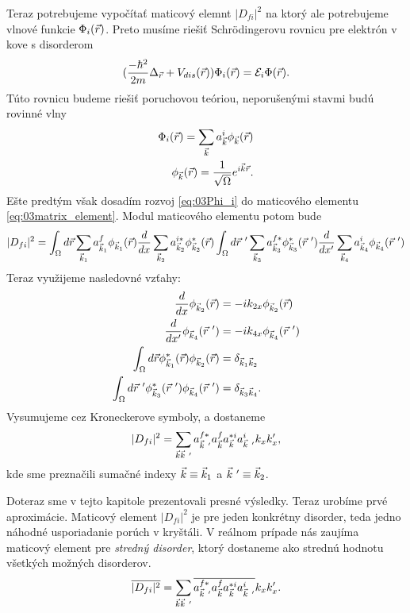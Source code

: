 Teraz potrebujeme vypočítať maticový elemnt $|D_{fi}|^2$ na ktorý ale potrebujeme vlnové funkcie $\Phi_i(\vec{r})$. Preto musíme riešiť Schr\"odingerovu rovnicu pre elektrón v kove s disorderom
\begin{align}
\label{eq:03SchrDis}
(\frac{-\hbar^2}{2m}\Delta_{\vec{r}} + V_{dis}(\vec{r}))\Phi_i(\vec{r})=\mathcal{E}_i\Phi(\vec{r})  \text{.}
\end{align}
Túto rovnicu budeme riešiť poruchovou teóriou, neporušenými stavmi budú rovinné vlny
\begin{align}
\label{eq:03Phi_i}
\Phi_i(\vec{r})=\sum_{\vec{k}}a^i_{\vec{k}}\phi_{\vec{k}}(\vec{r})\\
\label{eq:03rov}
\phi_{\vec{k}}(\vec{r})=\frac{1}{\sqrt \Omega}e^{i\vec{k}\vec{r}}\text{.}
\end{align}
Ešte predtým však dosadím rozvoj \eqref{eq:03Phi_i} do maticového elementu \eqref{eq:03matrix_element}. Modul maticového elementu potom bude
\begin{align}
|D_{fi}|^2=\int_\Omega d\vr \sum_{\vk_1}a_{\vk_1}^f\phi_{\vk_1}(\vr)\frac{d}{dx}\sum_{\vk_2}a_{\vk_2}^{i*}\phi_{\vk_2}^*(\vr)\int_\Omega d\vr\ ' \sum_{\vk_3}a_{\vk_3}^{f*}\phi_{\vk_3}^*(\vr\ ')\frac{d}{dx'}\sum_{\vk_4}a_{\vk_4}^i \phi_{\vk_4}(\vr\ ')
\end{align}
Teraz využijeme nasledovné vzťahy:
\begin{align}
\frac{d}{dx}\phi_{\vk_2}(\vr)&=-ik_{2x}\phi_{\vk_2}(\vr)\\
\frac{d}{dx'}\phi_{\vk_4}(\vr\ ')&=-ik_{4x}\phi_{\vk_4}(\vr\ ')\\
\int_\Omega d\vr \phi_{\vk_1}^*(\vr)\phi_{\vk_2}(\vr)&=\delta_{\vk_1\vk_2}\\
\int_\Omega d\vr\ '\phi_{\vk_3}^*(\vr\ ')\phi_{\vk_4}(\vr\ ')&=\delta_{\vk_3\vk_4} \text{.}
\end{align}
Vysumujeme cez Kroneckerove symboly, a dostaneme
\begin{align}
|D_{fi}|^2=\sum_{\vk\vk\ '} a^{f*}_{\vk\ '}a^f_{\vk}a^{*i}_{\vk}a^i_{\vk\ '}k_xk_x' \text{,}
\end{align}
kde sme preznačili sumačné indexy $\vec{k}\equiv \vec{k}_1$ a $\vec{k}\ '\equiv \vec{k}_2$.

Doteraz sme v tejto kapitole prezentovali presné výsledky. Teraz urobíme prvé aproximácie. Maticový element $|D_{fi}|^2$ je pre jeden konkrétny disorder, teda jedno náhodné usporiadanie porúch v kryštáli. V reálnom prípade nás zaujíma maticový element pre {\it stredný disorder}, ktorý dostaneme ako strednú hodnotu všetkých možných disorderov.
\begin{align}
\overline{|D_{fi}|^2}=\sum_{\vk\vk\ '}\overline{a^{f*}_{\vk\ '}a^f_{\vk}a^{*i}_{\vk}a^i_{\vk\ '}}k_xk_x' \text{.} 
\end{align}

